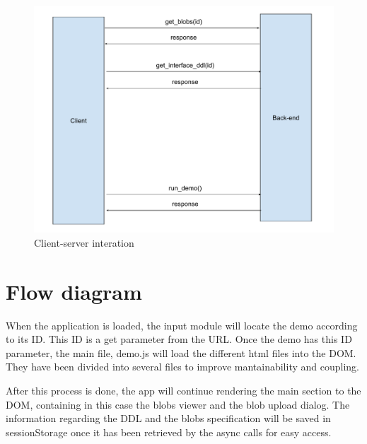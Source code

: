 \begin{figure}[h]
	\centering
	\includegraphics[width=\textwidth]{images/client_server_interaction}
	\caption{Client-server interation} 
	\label{fig:server_interaction}
\end{figure}


\section{Flow diagram}
When the application is loaded, the input module will locate the demo according to its ID. This ID is a get parameter from the URL.
Once the demo has this ID parameter, the main file, demo.js will load the different html files into the DOM. They have been divided 
into several files to improve mantainability and coupling.

After this process is done, the app will continue rendering the main section to the DOM, containing in this case the blobs viewer and 
the blob upload dialog. The information regarding the DDL and the blobs specification will be saved in sessionStorage once it 
has been retrieved by the async calls for easy access.

